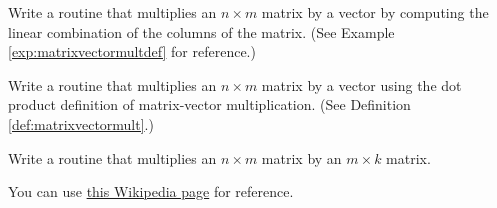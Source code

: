 \documentclass{ximera}
\begin{document}
\begin{problem}\label{prob_oct_mat2}
Write a routine that multiplies an $n\times m$ matrix by a vector by computing the linear combination of the columns of the matrix. (See Example \ref{exp:matrixvectormultdef} for reference.)  
\end{problem}

\begin{problem}\label{prob_oct_mat3}
Write a routine that multiplies an $n\times m$ matrix by a vector using the dot product definition of matrix-vector multiplication. (See Definition \ref{def:matrixvectormult}.)
    
\end{problem}

\begin{problem}\label{prob_oct_6}
    Write a routine that multiplies an $n\times m$ matrix by an $m\times k$ matrix.  

    \begin{hint}
        You can use \href{https://en.wikipedia.org/wiki/Matrix_multiplication_algorithm}{this Wikipedia page} for reference.
    \end{hint}    
\end{problem}
\end{document}
